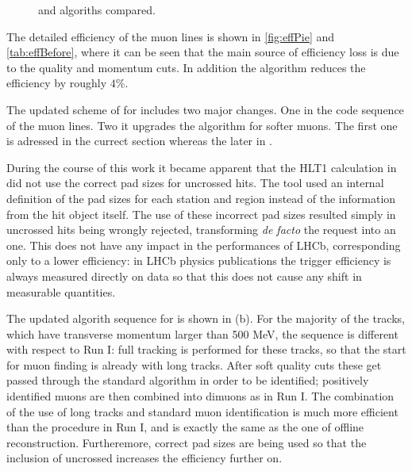 \begin{figure}[h!]
  \centering
  \scalebox{1}{}
  \scalebox{1}{}
 \caption{ \runone and \runtwo \hltone algoriths compared. }
  \label{hlt1_algo_seq}
\end{figure}

The detailed efficiency of the \runone \hltone muon lines is shown in \autoref{fig:effPie} and \autoref{tab:effBefore},
where it can be seen that the main source of efficiency loss is due to the quality and momentum cuts.
In addition the \mvm algorithm reduces the efficiency by roughly $4\%$.

The updated scheme of \hltone for \runtwo includes two major changes.
One in the code sequence of the \hltone muon lines. Two it upgrades the \mvm algorithm for softer muons. The first one is adressed
in the currect section whereas the later in .

During the course of this work it became apparent that the HLT1  calculation in \runone
did not use the correct pad sizes for uncrossed hits.
The tool used an internal definition of the pad sizes for each station and
region instead of the information from the hit object itself.
The use of these incorrect pad sizes resulted simply in uncrossed hits being wrongly
rejected, transforming \emph{de facto} the  request into an  one.
This does not have any impact in the performances of LHCb, corresponding only to a lower efficiency:
in LHCb physics publications the trigger efficiency is always measured directly on data so that this
does not cause any shift in measurable quantities.

The updated \hltone algorith sequence for \runtwo is shown in (b).
For the majority of the tracks, which have transverse momentum larger than 500 MeV, the sequence is different with respect to
Run I:
full tracking is performed for these tracks, so that the start for muon finding is already with long tracks.
After soft quality cuts these get passed through the standard  algorithm in order to be identified;
positively identified muons are then combined into dimuons as in Run I.
The combination of the use of long tracks and standard muon identification is much more efficient than the
procedure in Run I, and is exactly the same as the one of offline reconstruction.
Furtheremore, correct pad sizes are being used so that the inclusion of uncrossed increases the efficiency further on.


